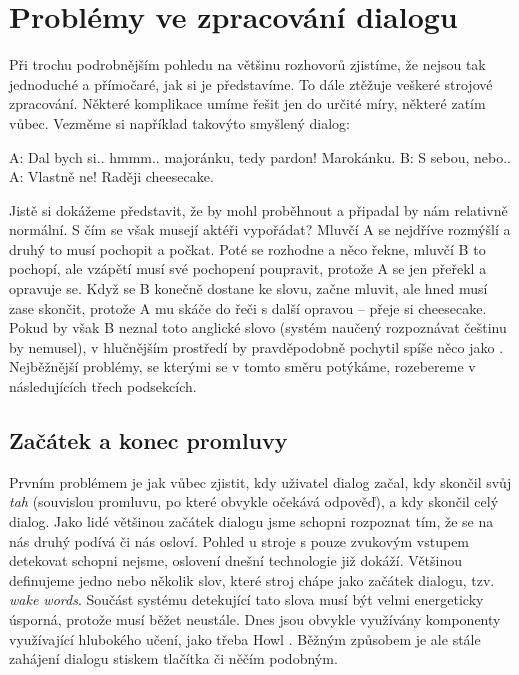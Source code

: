 \section{Problémy ve zpracování dialogu}

Při trochu podrobnějším pohledu na většinu rozhovorů zjistíme, že nejsou
tak jednoduché a přímočaré, jak si je představíme. To dále ztěžuje
veškeré strojové zpracování. Některé komplikace umíme řešit jen do určité
míry, některé zatím vůbec. Vezměme si například takovýto smyšlený dialog:

\begin{code}
    A: Dal bych si.. hmmm.. majoránku, tedy pardon! Marokánku.
    B: S sebou, nebo..
    A: Vlastně ne! Raději cheesecake.
\end{code}

Jistě si dokážeme představit, že by mohl proběhnout a připadal by nám
relativně normální. S čím se však musejí aktéři vypořádat? Mluvčí A se
nejdříve rozmýšlí a druhý to musí pochopit a počkat. Poté se rozhodne
a něco řekne, mluvčí B to pochopí, ale vzápětí musí své pochopení
poupravit, protože A se jen přeřekl a opravuje se. Když se B konečně
dostane ke slovu, začne mluvit, ale hned musí zase skončit, protože
A mu skáče do řeči s další opravou -- přeje si cheesecake. Pokud by
však B neznal toto anglické slovo (systém naučený rozpoznávat češtinu
by nemusel), v hlučnějším prostředí by pravděpodobně pochytil spíše
něco jako . Nejběžnější problémy, se kterými se v tomto
směru potýkáme, rozebereme v následujících třech podsekcích.

\subsection{Začátek a konec promluvy}

Prvním problémem je jak vůbec zjistit, kdy uživatel dialog začal, kdy
skončil svůj \textit{tah} (souvislou promluvu, po které obvykle očekává odpověď),
a kdy skončil celý dialog.
Jako lidé většinou začátek dialogu jsme schopni rozpoznat tím, že se na
nás druhý podívá či nás osloví. Pohled u stroje s pouze zvukovým vstupem
detekovat schopni nejsme, oslovení dnešní technologie již dokáží. Většinou
definujeme jedno nebo několik slov, které stroj chápe jako začátek dialogu,
tzv. \textit{wake words}. Součást systému detekující tato slova musí být velmi
energeticky úsporná, protože musí běžet neustále. Dnes jsou obvykle
využívány komponenty využívající hlubokého učení, jako třeba Howl
\citep{tang_howl_2020}.
Běžným způsobem je ale stále zahájení dialogu stiskem tlačítka či něčím
podobným.

